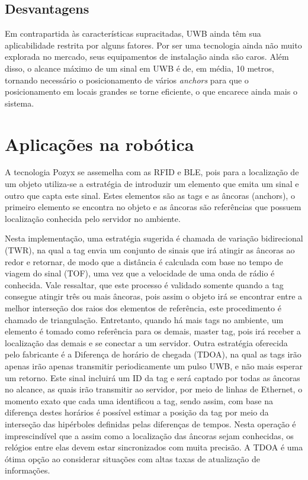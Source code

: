 \subsection{Desvantagens}
Em contrapartida às características supracitadas, UWB ainda têm sua aplicabilidade restrita por alguns fatores.
Por ser uma tecnologia ainda não muito explorada no mercado, seus equipamentos de instalação ainda são caros. Além disso,
o alcance máximo de um sinal em UWB é de, em média, 10 metros, tornando necessário o posicionamento de vários \textit{anchors} para que
o posicionamento em locais grandes se torne eficiente, o que encarece ainda mais o sistema.

\section{Aplicações na robótica}
A tecnologia Pozyx se assemelha com as RFID e BLE, pois para a localização de um objeto utiliza-se a estratégia de introduzir um elemento que emita um sinal e outro que capta este sinal. Estes elementos são as tags e as âncoras (anchors), o primeiro elemento se encontra no objeto e as âncoras são referências que possuem localização conhecida pelo servidor no ambiente. 

Nesta implementação, uma estratégia sugerida é chamada de variação bidirecional (TWR), na qual a tag envia um conjunto de sinais que irá atingir as âncoras ao redor e retornar,  de modo que a distância é calculada com base no tempo de viagem do sinal (TOF), uma vez que a velocidade de uma onda de rádio é conhecida. Vale ressaltar, que este processo é validado somente quando a tag consegue atingir três ou mais âncoras, pois assim o objeto irá se encontrar entre a melhor interseção dos raios dos elementos de referência, este procedimento é chamado de triangulação. Entretanto, quando há mais tags no ambiente, um elemento é tomado como referência para os demais, master tag, pois irá receber a localização das demais e se conectar a um servidor. Outra estratégia oferecida pelo fabricante é a Diferença de horário de chegada (TDOA), na qual as tags irão apenas irão apenas transmitir periodicamente um pulso UWB, e não mais esperar um retorno. Este sinal incluirá um ID da tag e será captado por todas as âncoras no alcance, as quais irão transmitir ao servidor, por meio de linhas de Ethernet, o momento exato que cada uma identificou a tag, sendo assim, com base na diferença destes horários  é possível estimar a posição da tag por meio da interseção das hipérboles definidas pelas diferenças de tempos. Nesta operação é imprescindível que a assim como a localização das âncoras sejam conhecidas, os relógios entre elas devem estar sincronizados com muita precisão. A TDOA é uma ótima opção ao considerar situações com altas taxas de atualização de informações. 

